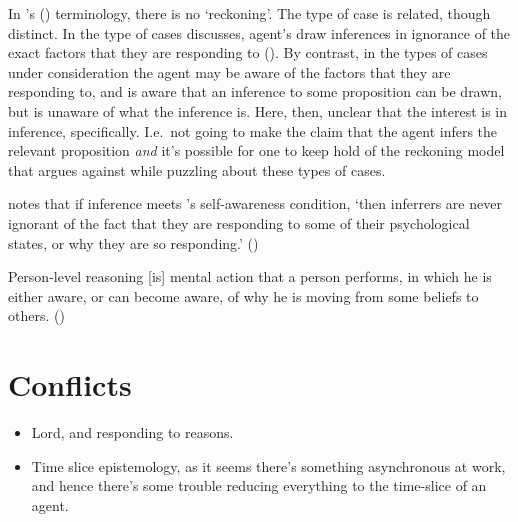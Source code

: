 \documentclass[10pt]{article}
\newcommand{\hozline}[0]{%
  \noindent\hdashrule[0.5ex][c]{\textwidth}{.1pt}{}
}
\newcommand{\hozlinedash}[0]{%
  \noindent\hdashrule[0.5ex][c]{\textwidth}{.1pt}{2.5pt}
}
\begin{document}
In \citeauthor{Siegel:2019aa}'s (\citeyear{Siegel:2019aa}) terminology, there is no `reckoning'.
The type of case is related, though distinct.
In the type of cases \citeauthor{Siegel:2019aa} discusses, agent's draw inferences in ignorance of the exact factors that they are responding to (\citeyear[8]{Siegel:2019aa}).
By contrast, in the types of cases under consideration the agent may be aware of the factors that they are responding to, and is aware that an inference to some proposition can be drawn, but is unaware of what the inference is.
Here, then, unclear that the interest is in inference, specifically.
I.e.\ not going to make the claim that the agent infers the relevant proposition \emph{and} it's possible for one to keep hold of the reckoning model that \citeauthor{Siegel:2019aa} argues against while puzzling about these types of cases.

\hozlinedash

\citeauthor{Siegel:2019aa} notes that if inference meets \citeauthor{Boghossian:2014aa}'s self-awareness condition, `then inferrers are never ignorant of the fact that they are responding to some of their psychological states, or why they are so responding.' (\citeyear[6]{Siegel:2019aa})

\begin{description}[font=\bfseries, leftmargin=.75cm, style=nextline]
\item[Self-awareness condition] Person-level reasoning [is] mental action that a person performs, in which he is either aware, or can become aware, of why he is moving from some beliefs to others.\nolinebreak
  \mbox{}\hfill\mbox{(\citeyear[16]{Boghossian:2014aa})}
\end{description}




\section{Conflicts}
\label{sec:conflicts}

\begin{itemize}
\item Lord, and responding to reasons.
\item Time slice epistemology, as it seems there's something asynchronous at work, and hence there's some trouble reducing everything to the time-slice of an agent.
\end{itemize}

\newpage

\hozline
\end{document}
